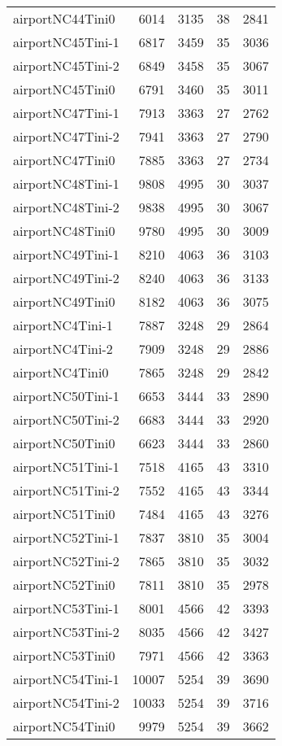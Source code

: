 \begin{longtable}{lrrrr}
airportNC44Tini0 & 6014 & 3135 & 38 & 2841 \\
airportNC45Tini-1 & 6817 & 3459 & 35 & 3036 \\
airportNC45Tini-2 & 6849 & 3458 & 35 & 3067 \\
airportNC45Tini0 & 6791 & 3460 & 35 & 3011 \\
airportNC47Tini-1 & 7913 & 3363 & 27 & 2762 \\
airportNC47Tini-2 & 7941 & 3363 & 27 & 2790 \\
airportNC47Tini0 & 7885 & 3363 & 27 & 2734 \\
airportNC48Tini-1 & 9808 & 4995 & 30 & 3037 \\
airportNC48Tini-2 & 9838 & 4995 & 30 & 3067 \\
airportNC48Tini0 & 9780 & 4995 & 30 & 3009 \\
airportNC49Tini-1 & 8210 & 4063 & 36 & 3103 \\
airportNC49Tini-2 & 8240 & 4063 & 36 & 3133 \\
airportNC49Tini0 & 8182 & 4063 & 36 & 3075 \\
airportNC4Tini-1 & 7887 & 3248 & 29 & 2864 \\
airportNC4Tini-2 & 7909 & 3248 & 29 & 2886 \\
airportNC4Tini0 & 7865 & 3248 & 29 & 2842 \\
airportNC50Tini-1 & 6653 & 3444 & 33 & 2890 \\
airportNC50Tini-2 & 6683 & 3444 & 33 & 2920 \\
airportNC50Tini0 & 6623 & 3444 & 33 & 2860 \\
airportNC51Tini-1 & 7518 & 4165 & 43 & 3310 \\
airportNC51Tini-2 & 7552 & 4165 & 43 & 3344 \\
airportNC51Tini0 & 7484 & 4165 & 43 & 3276 \\
airportNC52Tini-1 & 7837 & 3810 & 35 & 3004 \\
airportNC52Tini-2 & 7865 & 3810 & 35 & 3032 \\
airportNC52Tini0 & 7811 & 3810 & 35 & 2978 \\
airportNC53Tini-1 & 8001 & 4566 & 42 & 3393 \\
airportNC53Tini-2 & 8035 & 4566 & 42 & 3427 \\
airportNC53Tini0 & 7971 & 4566 & 42 & 3363 \\
airportNC54Tini-1 & 10007 & 5254 & 39 & 3690 \\
airportNC54Tini-2 & 10033 & 5254 & 39 & 3716 \\
airportNC54Tini0 & 9979 & 5254 & 39 & 3662 \\

\end{longtable}

